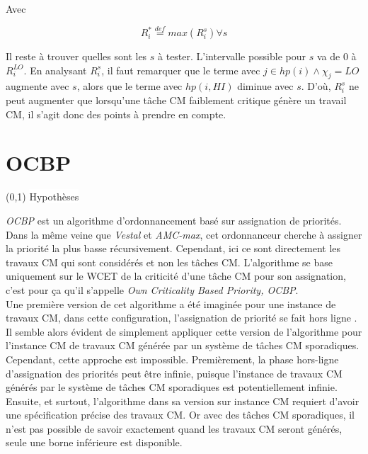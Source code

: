 \documentclass[12pt,a4paper,oneside]{book}
\theoremstyle{break}
\theoremstyle{breakplain}
\begin{document}
\pagebreak

Avec

\begin{equation}
R_i^* \overset{def}{=} max(R_i^s) \forall s
\end{equation}

Il reste à trouver quelles sont les $s$ à tester. L'intervalle possible pour $s$ va de $0$ à $R^{LO}_i$. En analysant $R_i^s$, il faut remarquer que le terme avec $j \in hp(i) \wedge \chi_j = LO$ augmente avec $s$, alors que le terme avec $hp(i, HI)$ diminue avec $s$. D'où, $R_i^s$ ne peut augmenter que lorsqu'une tâche CM faiblement critique génère un travail CM, il s'agit donc des points à prendre en compte.

\section{OCBP}
\label{ocbpext}
\begin{center}
\boxput*(0,1){
\colorbox{white}{Hypothèses}
}{
\setlength{\fboxsep}{6pt}
}
\end{center}

\textit{OCBP} est un algorithme d'ordonnancement basé sur assignation de priorités. Dans la même veine que \textit{Vestal} et \textit{AMC-max}, cet ordonnanceur cherche à assigner la priorité la plus basse récursivement. Cependant, ici ce sont directement les travaux CM qui sont considérés et non les tâches CM. L'algorithme se base uniquement sur le WCET de la criticité d'une tâche CM pour son assignation, c'est pour ça qu'il s'appelle \textit{Own Criticality Based Priority, OCBP}.\\

Une première version de cet algorithme a été imaginée pour une instance de travaux CM, dans cette configuration, l'assignation de priorité se fait hors ligne \cite{baruah2010towards}. Il semble alors évident de simplement appliquer cette version de l'algorithme pour l'instance CM de travaux CM générée par un système de tâches CM sporadiques. Cependant, cette approche est impossible. Premièrement, la phase hors-ligne d'assignation des priorités peut être infinie, puisque l'instance de travaux CM générés par le système de tâches CM sporadiques est potentiellement infinie. Ensuite, et surtout, l'algorithme dans sa version sur instance CM requiert d'avoir une spécification précise des travaux CM. Or avec des tâches CM sporadiques, il n'est pas possible de savoir exactement quand les travaux CM seront générés, seule une borne inférieure est disponible.\\
\end{document}
